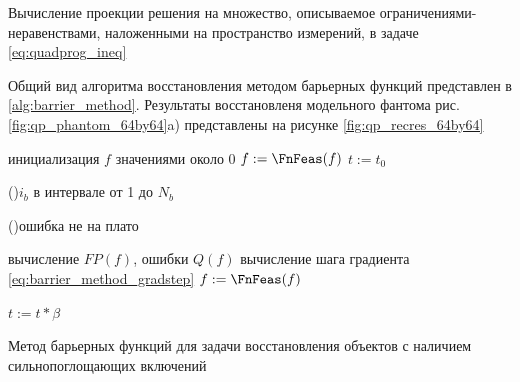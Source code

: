\begin{algorithm}[H]

\vspace{0.5cm}
\vspace{0.5cm}

 \caption{Вычисление проекции решения на множество, описываемое ограничениями-неравенствами, наложенными на пространство измерений, в задаче \eqref{eq:quadprog_ineq}}
 \label{alg:hough_barrier_projection}
\end{algorithm}

Общий вид алгоритма восстановления методом барьерных функций представлен в \ref{alg:barrier_method}.
Результаты восстановленя модельного фантома рис. \ref{fig:qp_phantom_64by64}a) представлены на рисунке \ref{fig:qp_recres_64by64}

\begin{algorithm}[H]
\vspace{0.5cm}



 инициализация $f$ значениями около 0 \;
 $f := \FnFeas(f)$ \;
 $t := t_0$ \;

 \For(){$i_b$ в интервале от 1 до $N_b$}{
  \While(){ошибка не на плато}{

  вычисление $FP(f)$, ошибки $Q(f)$ \;
  вычисление шага градиента \eqref{eq:barrier_method_gradstep}\;
  $f := \FnFeas(f)$\;
  }
  $t := t * \beta$ \;

 }

\vspace{0.5cm}
 \caption{Метод барьерных функций для задачи восстановления объектов с наличием сильнопоглощающих включений}
 \label{alg:barrier_method}
\end{algorithm}

